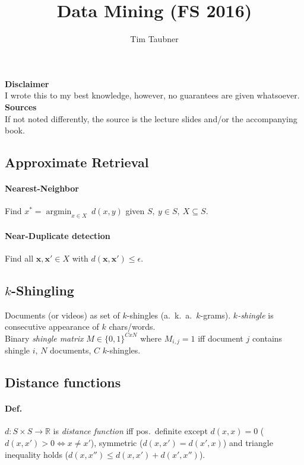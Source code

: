 \documentclass[9pt]{scrartcl}
\title{Data Mining (FS 2016)}
\author{Tim Taubner}
\DeclareMathOperator{\argmin}{argmin}
\newcommand{\eps}{\epsilon}
\newcommand{\R}{\mathbb{R}}
\begin{document}
\pagestyle{fancy}
\fancyhf{}
\fancyhead[L]{\title}

\begin{centering}
\vspace*{1em}
\vfill
\textbf{Disclaimer} \\
I wrote this to my best knowledge, however, no guarantees are given whatsoever.
\vfill
\textbf{Sources} \\
If not noted differently, the source is the lecture slides and/or the accompanying book.
\vfill
\end{centering}

\setcounter{page}{0}

\clearpage

\begin{twocolumn}

\section{Approximate Retrieval}
\paragraph{Nearest-Neighbor} Find $x^* = \argmin_{x \in X} \ d(x,y)$
given $S,\ y \in S,\ X\subseteq S$.
\paragraph{Near-Duplicate detection}
Find all $\bm x, \bm x'\in X$ with $d(\bm x,\bm x') \leq \eps$.
\subsection{$k$-Shingling}
Documents (or videos) as set of $k$-shingles (a.\ k.\ a.\ $k$-grams).
\emph{$k$-shingle} is consecutive appearance of $k$ chars/words. \\
Binary \emph{shingle matrix} $M \in \{0,1\}^{CxN}$ where $M_{i,j} = 1$ iff document $j$ contains shingle $i$, $N$ documents, $C$ $k$-shingles.
\subsection{Distance functions}
\paragraph{Def.}
$d: S \times S \rightarrow \R$ is \emph{distance function} iff pos.\ definite except $d(x,x) = 0$ ($d(x,x') > 0 \iff x \neq x'$), symmetric ($d(x,x') = d(x',x)$) and triangle inequality holds ($d(x,x'') \leq d(x,x') + d(x',x'')$).

\end{twocolumn}
\end{document}
